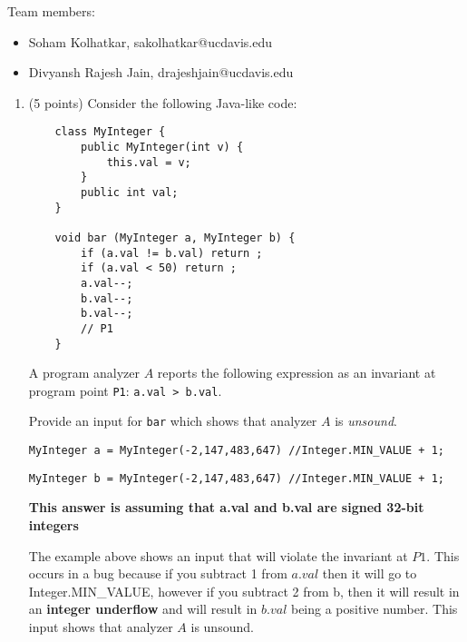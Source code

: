 \documentclass[12pt]{article}
\begin{document}
    \begin{mdframed}
      Team members:
      \begin{itemize}
        \item Soham Kolhatkar, sakolhatkar@ucdavis.edu %
        \item Divyansh Rajesh Jain, drajeshjain@ucdavis.edu %
      \end{itemize}
    \end{mdframed}

    
    \newpage
    \begin{enumerate}

    

\item (5 points) Consider the following Java-like code:
  \begin{lstlisting}
    class MyInteger {
        public MyInteger(int v) {
            this.val = v;
        }
        public int val;
    }

    void bar (MyInteger a, MyInteger b) {
        if (a.val != b.val) return ;
        if (a.val < 50) return ;
        a.val--;
        b.val--;
        b.val--;
        // P1
    }
  \end{lstlisting}
  A program analyzer $A$
  reports the following expression as an invariant 
  at program point \lstinline$P1$: \lstinline$a.val > b.val$.

  Provide an input for \lstinline$bar$ which shows that analyzer $A$ is \emph{unsound}.
    \begin{mdframed}
        \lstinline$MyInteger a = MyInteger(-2,147,483,647) //Integer.MIN_VALUE + 1; $
        
        \lstinline$MyInteger b = MyInteger(-2,147,483,647) //Integer.MIN_VALUE + 1;$

        \textbf{This answer is assuming that a.val and b.val are signed 32-bit integers}
    
        The example above shows an input that will violate the invariant at $P1$. This occurs in a bug because if you subtract 1 from $a.val$ then it will go to Integer.MIN\_VALUE, however if you subtract 2 from b, then it will result in an \textbf{integer underflow} and will result in $b.val$ being a positive number. This input shows that analyzer $A$ is unsound.
        
    \end{mdframed}


\end{enumerate}
\end{document}
